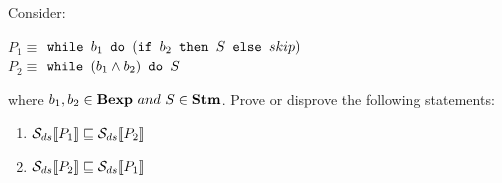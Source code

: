 \newcommand{\and}{\wedge}

\newcommand{\exEightA}
{$ \wbS{b_1}{(\ifABC{b_2}{S}{skip})} $}

\newcommand{\exEightB}
{$  \wbS{(b_1 \and b_2)}{S} $}

\newcommand{\Sds}{\dsCtxt{S}}
\newcommand{\mineq}{\sqsubseteq}

{
    Consider: 
    \begin{center}
    $ P_1 \equiv $ \exEightA \\
    $ P_2 \equiv $ \exEightB
    \end{center}
    where $ b_1, b_2 \in\mbox{\textbf{Bexp}}~and~S\in\mbox{\textbf{Stm}}$. Prove or disprove the following
    statements: 
    \begin{enumerate}
    \item $\dsCtxt{P_1} \mineq \dsCtxt{P_2}$
    \item $\dsCtxt{P_2} \mineq \dsCtxt{P_1}$
    \end{enumerate}
}
